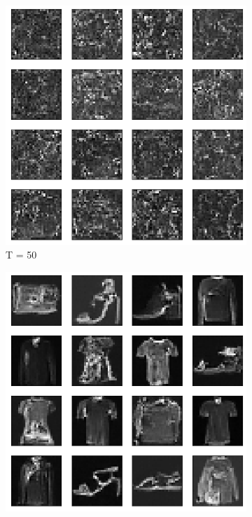 \documentclass{article}
\begin{document}
\begin{figure}[H]
	\begin{subfigure}[h]{0.3\linewidth}
		\centering
		\includegraphics[scale=0.3]{../code/generated_DDPM_50.png}
		\caption{T = 50}
	\end{subfigure}
	\hfill
	\begin{subfigure}[h]{0.3\linewidth}
		\centering
		\includegraphics[scale=0.3]{../code/generated_DDPM_300.png}

\end{subfigure}
\end{figure}
\end{document}
